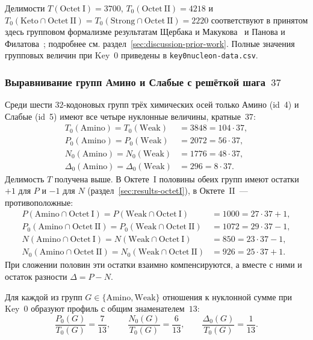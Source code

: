 \documentclass[11pt,a4paper]{article}
\renewcommand{\_}{\origunderscore\allowbreak}
\begin{document}
Делимости $T(\mathrm{Octet~I})=3700$,
$T_{0}(\mathrm{Octet~II})=4218$ и
$T_{0}(\mathrm{Keto}\cap\mathrm{Octet~II})
=T_{0}(\mathrm{Strong}\cap\mathrm{Octet~II})=2220$
соответствуют в принятом здесь групповом формализме результатам
Щербака и Макукова~\cite{makukov2013} и Панова и
Филатова~\cite{panov2024}; подробнее см.
раздел~\ref{sec:discussion-prior-work}. Полные значения групповых
величин при Key~0 приведены в
\texttt{key0\_nucleon-data.csv}.

\subsubsection{Выравнивание групп Амино и Слабые с решёткой
шага~\texorpdfstring{$37$}{37}}
\label{sec:results-key0-aminoweak}

Среди шести $32$-кодоновых групп трёх химических осей только Амино
(id~4) и Слабые (id~5) имеют все четыре нуклонные величины,
кратные~$37$:
\[
\begin{aligned}
T_{0}(\mathrm{Amino})=T_{0}(\mathrm{Weak})
  &=3848=104\cdot37, \\
P_{0}(\mathrm{Amino})=P_{0}(\mathrm{Weak})
  &=2072=56\cdot37, \\
N_{0}(\mathrm{Amino})=N_{0}(\mathrm{Weak})
  &=1776=48\cdot37, \\
\Delta_{0}(\mathrm{Amino})=\Delta_{0}(\mathrm{Weak})
  &=296=8\cdot37.
\end{aligned}
\]
Делимость $T$ получена выше. В Октете~I половины обеих групп имеют
остатки $+1$ для $P$ и $-1$ для $N$
(раздел~\ref{sec:results-octetI}), в Октете~II~--- противоположные:
\[
\begin{aligned}
P(\mathrm{Amino}\cap\mathrm{Octet~I})
  =P(\mathrm{Weak}\cap\mathrm{Octet~I})
  &=1000=27\cdot37+1, \\
P_{0}(\mathrm{Amino}\cap\mathrm{Octet~II})
  =P_{0}(\mathrm{Weak}\cap\mathrm{Octet~II})
  &=1072=29\cdot37-1, \\
N(\mathrm{Amino}\cap\mathrm{Octet~I})
  =N(\mathrm{Weak}\cap\mathrm{Octet~I})
  &=850=23\cdot37-1, \\
N_{0}(\mathrm{Amino}\cap\mathrm{Octet~II})
  =N_{0}(\mathrm{Weak}\cap\mathrm{Octet~II})
  &=926=25\cdot37+1.
\end{aligned}
\]
При сложении половин эти остатки взаимно компенсируются, а вместе с
ними и остаток разности $\Delta=P-N$.

Для каждой из групп $G\in\{\mathrm{Amino},\mathrm{Weak}\}$
отношения к нуклонной сумме при Key~0 образуют профиль
с общим знаменателем~$13$:
\[
\frac{P_0(G)}{T_0(G)}=\frac{7}{13},\qquad
\frac{N_0(G)}{T_0(G)}=\frac{6}{13},\qquad
\frac{\Delta_0(G)}{T_0(G)}=\frac{1}{13}.
\]
\end{document}
